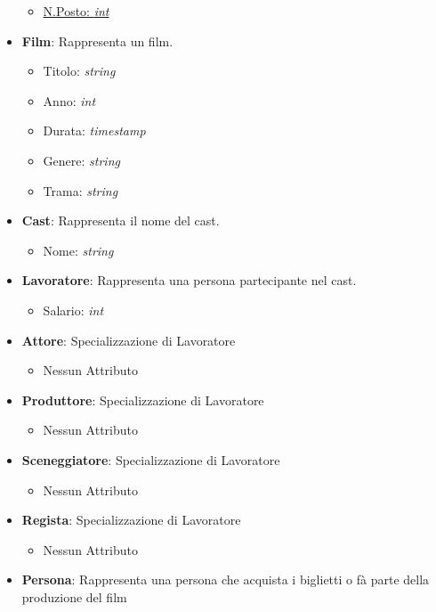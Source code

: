 \documentclass[10pt]{article}
\begin{document}
\begin{itemize}
\begin{itemize}
			\item \underline{N.Posto: \textit{int}}
		\end{itemize}
		\item \textbf{Film}: Rappresenta un film.
		\begin{itemize}
			\item Titolo: \textit{string}
			\item Anno: \textit{int}
			\item Durata: \textit{timestamp}
			\item Genere: \textit{string}
			\item Trama: \textit{string}
		\end{itemize}
		\item \textbf{Cast}: Rappresenta il nome del cast.
		\begin{itemize}
			\item Nome: \textit{string}
		\end{itemize}
		\item \textbf{Lavoratore}: Rappresenta una persona partecipante nel cast.
		\begin{itemize}
			\item Salario: \textit{int}
		\end{itemize}
		\item \textbf{Attore}: Specializzazione di Lavoratore
		\begin{itemize}
			\item Nessun Attributo
		\end{itemize}
		\item \textbf{Produttore}: Specializzazione di Lavoratore
		\begin{itemize}
			\item Nessun Attributo
		\end{itemize}
		\item \textbf{Sceneggiatore}: Specializzazione di Lavoratore
		\begin{itemize}
			\item Nessun Attributo
		\end{itemize}
		\item \textbf{Regista}: Specializzazione di Lavoratore
		\begin{itemize}
			\item Nessun Attributo
		\end{itemize}
		\item \textbf{Persona}: Rappresenta una persona che acquista i biglietti o fà parte della produzione del film
		\begin{itemize}

\end{itemize}
\end{itemize}
\end{document}
